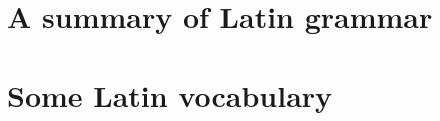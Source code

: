 \documentclass{ifacconf}
\begin{document}
                                                   







\appendix
\section{A summary of Latin grammar}    %
\section{Some Latin vocabulary}              %
\end{document}
